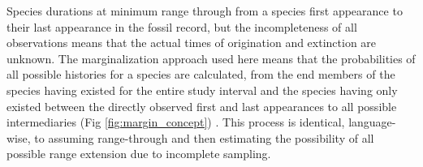 \documentclass[12pt,letterpaper]{article}
\begin{document}
Species durations at minimum range through from a species first appearance to their last appearance in the fossil record, but the incompleteness of all observations means that the actual times of origination and extinction are unknown. The marginalization approach used here means that the probabilities of all possible histories for a species are calculated, from the end members of the species having existed for the entire study interval and the species having only existed between the directly observed first and last appearances to all possible intermediaries (Fig \ref{fig:margin_concept}) \citep{StanDevelopmentTeam2016}. This process is identical, language-wise, to assuming range-through and then estimating the possibility of all possible range extension due to incomplete sampling. %
\end{document}
